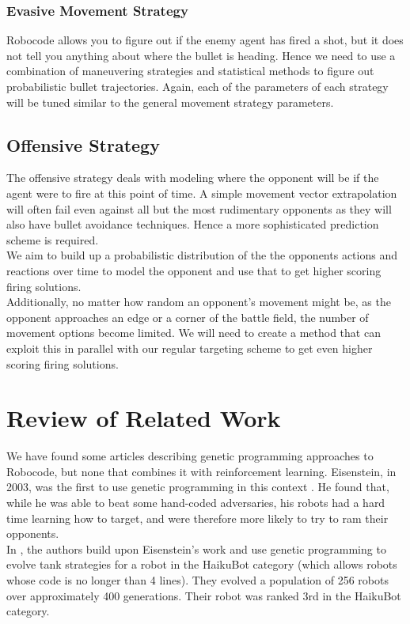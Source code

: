 \documentclass{article}
\theoremstyle{plain}
\theoremstyle{definition}
\theoremstyle{remark}
\begin{document}
\subsubsection*{Evasive Movement Strategy}
Robocode allows you to figure out if the enemy agent has fired a shot, but it does not tell you anything about where the bullet is heading. Hence we need to use a combination of maneuvering strategies and statistical methods to figure out probabilistic bullet trajectories. Again, each of the parameters of each strategy will be tuned similar to the general movement strategy parameters.

\subsection*{Offensive Strategy}
The offensive strategy deals with modeling where the opponent will be if the agent were to fire at this point of time. A simple movement vector extrapolation will often fail even against all but the most rudimentary opponents as they will also have bullet avoidance techniques. Hence a more sophisticated prediction scheme is required.\\

We aim to build up a probabilistic distribution of the the opponents actions and reactions over time to model the opponent and use that to get higher scoring firing solutions.\\

Additionally, no matter how random an opponent's movement might be, as the opponent approaches an edge or a corner of the battle field, the number of movement options become limited. We will need to create a method that can exploit this in parallel with our regular targeting scheme to get even higher scoring firing solutions.

\section{Review of Related Work}
We have found some articles describing genetic programming
approaches to Robocode, but none that combines it with reinforcement
learning. Eisenstein, in 2003, was the first to use genetic programming
in this context \cite{gp2}. He found that,
while he was able to beat some hand-coded adversaries, his robots
had a hard time learning how to target, and were therefore more
likely to try to ram their opponents.\\


In \cite{gp1}, the authors build upon Eisenstein's work and use genetic programming to evolve tank
strategies for a robot in the HaikuBot category (which allows
robots whose code is no longer than 4 lines). They evolved a population
of 256 robots over approximately 400 generations. Their robot was ranked
3rd in the HaikuBot category.\\
\end{document}
